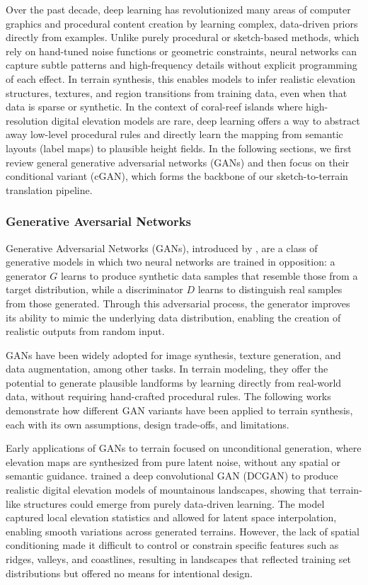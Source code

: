 Over the past decade, deep learning has revolutionized many areas of computer graphics and procedural content creation by learning complex, data-driven priors directly from examples. Unlike purely procedural or sketch-based methods, which rely on hand-tuned noise functions or geometric constraints, neural networks can capture subtle patterns and high-frequency details without explicit programming of each effect. In terrain synthesis, this enables models to infer realistic elevation structures, textures, and region transitions from training data, even when that data is sparse or synthetic. In the context of coral-reef islands where high-resolution digital elevation models are rare, deep learning offers a way to abstract away low-level procedural rules and directly learn the mapping from semantic layouts (label maps) to plausible height fields. In the following sections, we first review general generative adversarial networks (GANs) and then focus on their conditional variant (cGAN), which forms the backbone of our sketch-to-terrain translation pipeline.

\subsubsection{Generative Aversarial Networks}
\label{sec:coral-island-sota-GAN}

Generative Adversarial Networks (GANs), introduced by \cite{Goodfellow2014}, are a class of generative models in which two neural networks are trained in opposition: a generator $G$ learns to produce synthetic data samples that resemble those from a target distribution, while a discriminator $D$ learns to distinguish real samples from those generated. Through this adversarial process, the generator improves its ability to mimic the underlying data distribution, enabling the creation of realistic outputs from random input.

GANs have been widely adopted for image synthesis, texture generation, and data augmentation, among other tasks. In terrain modeling, they offer the potential to generate plausible landforms by learning directly from real-world data, without requiring hand-crafted procedural rules. The following works demonstrate how different GAN variants have been applied to terrain synthesis, each with its own assumptions, design trade-offs, and limitations.



Early applications of GANs to terrain focused on unconditional generation, where elevation maps are synthesized from pure latent noise, without any spatial or semantic guidance. \citep{WulffJensen2018} trained a deep convolutional GAN (DCGAN) to produce realistic digital elevation models of mountainous landscapes, showing that terrain-like structures could emerge from purely data-driven learning. The model captured local elevation statistics and allowed for latent space interpolation, enabling smooth variations across generated terrains. However, the lack of spatial conditioning made it difficult to control or constrain specific features such as ridges, valleys, and coastlines, resulting in landscapes that reflected training set distributions but offered no means for intentional design.

